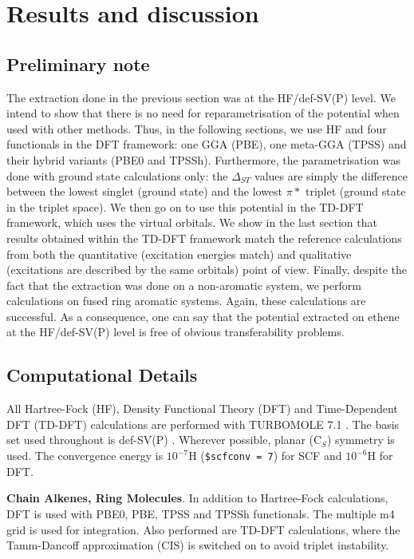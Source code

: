 \documentclass[aip]{revtex4-1}
\begin{document}
\section{Results and discussion}

\subsection{Preliminary note}
The extraction done in the previous section was at the HF/def-SV(P) level.
We intend to show that there is no need for reparametrisation of the potential
when used with other methods.
Thus, in the following sections, we use HF and four functionals in the DFT framework:
one GGA (PBE), one meta-GGA (TPSS) and their hybrid variants (PBE0 and TPSSh).
Furthermore, the parametrisation was done with ground state calculations only:
the $\Delta_{ST}$ values are simply the difference between the lowest singlet (ground state)
and the lowest $\pi*$ triplet (ground state in the triplet space).
We then go on to use this potential in the TD-DFT framework, which uses the virtual orbitals.
We show in the last section that results obtained within the TD-DFT framework
match the reference calculations from both the quantitative (excitation energies match)
and qualitative (excitations are described by the same orbitals) point of view.
Finally, despite the fact that the extraction was done on a non-aromatic system,
we perform calculations on fused ring aromatic systems.
Again, these calculations are successful.
As a consequence, one can say that the potential extracted on ethene at the HF/def-SV(P)
level is free of obvious transferability problems.

\subsection{Computational Details}
All Hartree-Fock (HF), Density Functional Theory (DFT) and Time-Dependent DFT (TD-DFT) calculations
are performed with TURBOMOLE 7.1 \cite{TURBOMOLE}.
The basis set used throughout is def-SV(P) \cite{defsvp}.
Wherever possible, planar (C\(_{S}\)) symmetry is used.
The convergence energy is \(10^{-7}\)H (\texttt{\$scfconv = 7}) for SCF and \(10^{-6}\)H for DFT.

\textbf{Chain Alkenes, Ring Molecules}. In addition to Hartree-Fock calculations, DFT is used with PBE0, PBE, TPSS and TPSSh functionals. \cite{pbe0,pbe,tpss,tpssh} The multiple m4 grid is used for integration. Also performed are TD-DFT calculations, where the Tamm-Dancoff approximation (CIS) \cite{tammdancoff} is switched on to avoid triplet instability.
\end{document}
